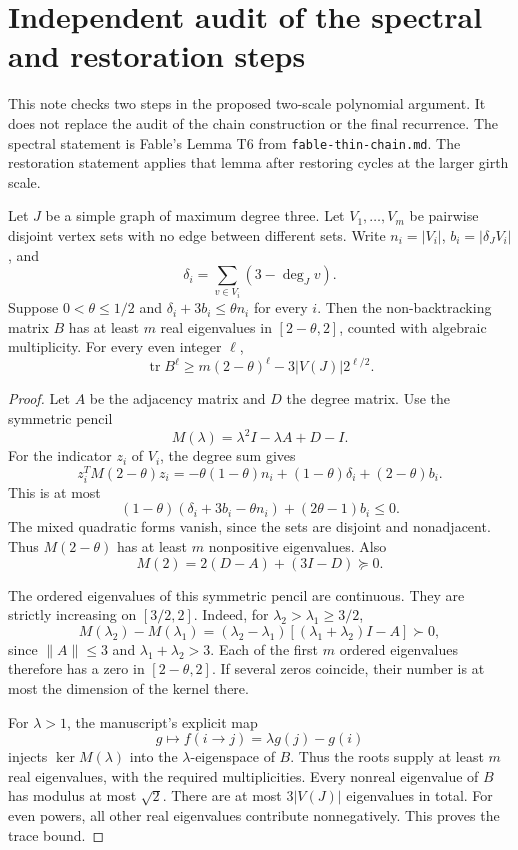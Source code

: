 \section{Independent audit of the spectral and restoration steps}
\label{sec:two-scale-independent-audit}

This note checks two steps in the proposed two-scale polynomial argument.
It does not replace the audit of the chain construction or the final recurrence.
The spectral statement is Fable's Lemma T6 from \texttt{fable-thin-chain.md}.
The restoration statement applies that lemma after restoring cycles at the larger girth scale.

\begin{lemma}
\label{lem:audit-multiple-perron}
Let $J$ be a simple graph of maximum degree three.
Let $V_1,\ldots,V_m$ be pairwise disjoint vertex sets with no edge between different sets.
Write $n_i=|V_i|$, $b_i=|\delta_JV_i|$, and
\[
 \delta_i=\sum_{v\in V_i}(3-\deg_Jv).
\]
Suppose $0<\theta\le1/2$ and $\delta_i+3b_i\le\theta n_i$ for every $i$.
Then the non-backtracking matrix $B$ has at least $m$ real eigenvalues in $[2-\theta,2]$, counted with algebraic multiplicity.
For every even integer $\ell$,
\[
 \operatorname{tr}B^\ell
 \ge m(2-\theta)^\ell-3|V(J)|2^{\ell/2}.
\]
\end{lemma}

\begin{proof}
Let $A$ be the adjacency matrix and $D$ the degree matrix.
Use the symmetric pencil
\[
 M(\lambda)=\lambda^2I-\lambda A+D-I.
\]
For the indicator $z_i$ of $V_i$, the degree sum gives
\[
 z_i^TM(2-\theta)z_i
 =-\theta(1-\theta)n_i+(1-\theta)\delta_i+(2-\theta)b_i.
\]
This is at most
\[
 (1-\theta)(\delta_i+3b_i-\theta n_i)+(2\theta-1)b_i\le0.
\]
The mixed quadratic forms vanish, since the sets are disjoint and nonadjacent.
Thus $M(2-\theta)$ has at least $m$ nonpositive eigenvalues.
Also
\[
 M(2)=2(D-A)+(3I-D)\succeq0.
\]

The ordered eigenvalues of this symmetric pencil are continuous.
They are strictly increasing on $[3/2,2]$.
Indeed, for $\lambda_2>\lambda_1\ge3/2$,
\[
 M(\lambda_2)-M(\lambda_1)
 =(\lambda_2-\lambda_1)[(\lambda_1+\lambda_2)I-A]\succ0,
\]
since $\|A\|\le3$ and $\lambda_1+\lambda_2>3$.
Each of the first $m$ ordered eigenvalues therefore has a zero in $[2-\theta,2]$.
If several zeros coincide, their number is at most the dimension of the kernel there.

For $\lambda>1$, the manuscript's explicit map
\[
 g\longmapsto f(i\mathbin{\to}j)=\lambda g(j)-g(i)
\]
injects $\ker M(\lambda)$ into the $\lambda$-eigenspace of $B$.
Thus the roots supply at least $m$ real eigenvalues, with the required multiplicities.
Every nonreal eigenvalue of $B$ has modulus at most $\sqrt2$.
There are at most $3|V(J)|$ eigenvalues in total.
For even powers, all other real eigenvalues contribute nonnegatively.
This proves the trace bound.
\end{proof}


